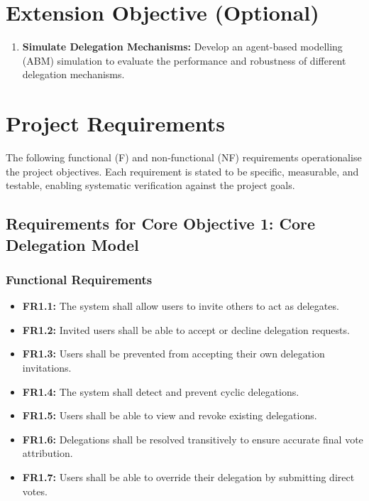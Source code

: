 \section{Extension Objective (Optional)}
\begin{enumerate}
    \item \textbf{Simulate Delegation Mechanisms:} Develop an agent-based modelling (ABM) simulation to evaluate the performance and robustness of different delegation mechanisms.
\end{enumerate}

\section{Project Requirements}
The following functional (F) and non-functional (NF) requirements operationalise the project objectives. Each requirement is stated to be specific, measurable, and testable, enabling systematic verification against the project goals.

\subsection{Requirements for Core Objective 1: Core Delegation Model}
\subsubsection{Functional Requirements}
\begin{itemize}
    \item \textbf{FR1.1:} The system shall allow users to invite others to act as delegates.
    \item \textbf{FR1.2:} Invited users shall be able to accept or decline delegation requests.
    \item \textbf{FR1.3:} Users shall be prevented from accepting their own delegation invitations.
    \item \textbf{FR1.4:} The system shall detect and prevent cyclic delegations.
    \item \textbf{FR1.5:} Users shall be able to view and revoke existing delegations.
    \item \textbf{FR1.6:} Delegations shall be resolved transitively to ensure accurate final vote attribution.
    \item \textbf{FR1.7:} Users shall be able to override their delegation by submitting direct votes.
\end{itemize}

